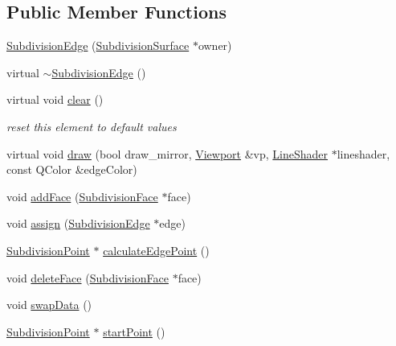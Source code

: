 \subsection*{Public Member Functions}
\begin{DoxyCompactItemize}
\item 
\hyperlink{classShipCAD_1_1SubdivisionEdge_ab08271ed7f5d371f0495d8a7d2c96dae}{Subdivision\-Edge} (\hyperlink{classShipCAD_1_1SubdivisionSurface}{Subdivision\-Surface} $\ast$owner)
\item 
virtual \hyperlink{classShipCAD_1_1SubdivisionEdge_ac787ad1a0228f91038de9518ad217364}{$\sim$\-Subdivision\-Edge} ()
\item 
virtual void \hyperlink{classShipCAD_1_1SubdivisionEdge_a08358ac65c2d710855b8b93c64ce9d02}{clear} ()
\begin{DoxyCompactList}\small\item\em reset this element to default values \end{DoxyCompactList}\item 
virtual void \hyperlink{classShipCAD_1_1SubdivisionEdge_a26deda12672fa679b49b28f2371e728b}{draw} (bool draw\-\_\-mirror, \hyperlink{classShipCAD_1_1Viewport}{Viewport} \&vp, \hyperlink{classShipCAD_1_1LineShader}{Line\-Shader} $\ast$lineshader, const Q\-Color \&edge\-Color)
\item 
void \hyperlink{classShipCAD_1_1SubdivisionEdge_a1b2e2b1d7e051d42250c0ad1f5eaa560}{add\-Face} (\hyperlink{classShipCAD_1_1SubdivisionFace}{Subdivision\-Face} $\ast$face)
\item 
void \hyperlink{classShipCAD_1_1SubdivisionEdge_a847a6c74d35e25fdcb46ea8b7a989836}{assign} (\hyperlink{classShipCAD_1_1SubdivisionEdge}{Subdivision\-Edge} $\ast$edge)
\item 
\hyperlink{classShipCAD_1_1SubdivisionPoint}{Subdivision\-Point} $\ast$ \hyperlink{classShipCAD_1_1SubdivisionEdge_aa1bce1c13f4911839205e812cfd0f683}{calculate\-Edge\-Point} ()
\item 
void \hyperlink{classShipCAD_1_1SubdivisionEdge_a1f4b70ab6d0c4dfec07a2d4348bc9a3e}{delete\-Face} (\hyperlink{classShipCAD_1_1SubdivisionFace}{Subdivision\-Face} $\ast$face)
\item 
void \hyperlink{classShipCAD_1_1SubdivisionEdge_ad19ddea08367fa2307e131132e36c008}{swap\-Data} ()
\item 
\hyperlink{classShipCAD_1_1SubdivisionPoint}{Subdivision\-Point} $\ast$ \hyperlink{classShipCAD_1_1SubdivisionEdge_a63a44ac44fe9d2729e5152303b249873}{start\-Point} ()
\item 

\end{DoxyCompactItemize}
